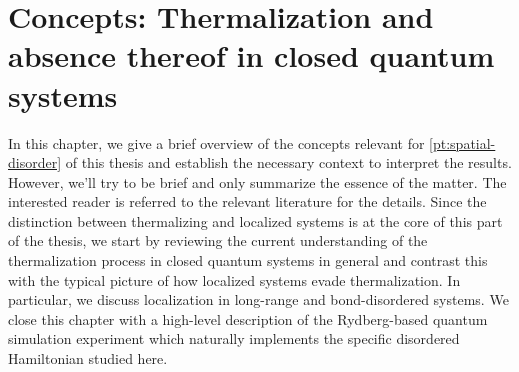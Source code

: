 \chapter{Concepts: Thermalization and absence thereof in closed quantum systems}\label{ch:concepts-thermalization}

In this chapter, we give a brief overview of the concepts relevant for \autoref{pt:spatial-disorder} of this thesis and establish the necessary context to interpret the results. However, we'll try to be brief and only summarize the essence of the matter. The interested reader is referred to the relevant literature for the details.
Since the distinction between thermalizing and localized systems is at the core of this part of the thesis, we start by reviewing the current understanding of the thermalization process in closed quantum systems in general and contrast this with the typical picture of how localized systems evade thermalization. In particular, we discuss localization in long-range and bond-disordered systems. We close this chapter with a high-level description of the Rydberg-based quantum simulation experiment which naturally implements the specific disordered Hamiltonian studied here.


